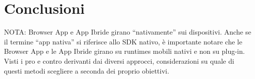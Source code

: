 	\section{Conclusioni}
	NOTA: Browser App e App Ibride girano “nativamente” sui dispositivi. Anche se il termine “app nativa” si riferisce allo SDK nativo, è importante notare che le Browser App e le App Ibride girano su runtimes mobili nativi e non su plug-in.
		Visti i pro e contro derivanti dai diversi approcci, considerazioni su
		quale di questi metodi scegliere a seconda dei proprio obiettivi.
		
	
		
	